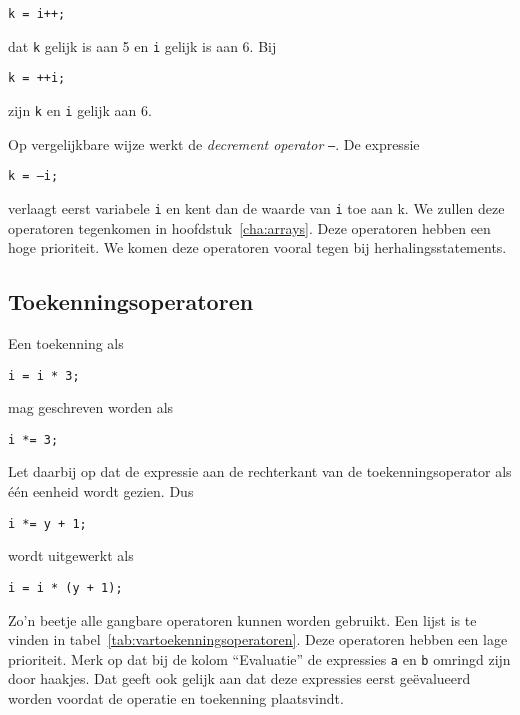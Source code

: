 \hspace*{1em}\texttt{k = i++;}

dat \texttt{k} gelijk is aan 5 en \texttt{i} gelijk is aan 6. Bij

\hspace*{1em}\texttt{k = ++i;}

zijn \texttt{k} en \texttt{i} gelijk aan 6.

Op vergelijkbare wijze werkt de \textsl{decrement operator} \texttt{--}\indexop{--}. De expressie

\hspace*{1em}\texttt{k = --i;}

verlaagt eerst variabele \texttt{i} en kent dan de waarde van \texttt{i} toe aan k. We zullen deze operatoren tegenkomen in hoofdstuk~\ref{cha:arrays}. Deze operatoren hebben een hoge prioriteit. We komen deze operatoren vooral tegen bij herhalingsstatements.

\subsection{Toekenningsoperatoren}
Een toekenning als

\hspace*{1em}\texttt{i = i * 3;}

mag geschreven worden als

\hspace*{1em}\texttt{i *= 3;}

Let daarbij op dat de expressie aan de rechterkant van de toekenningsoperator als één eenheid wordt gezien. Dus

\hspace*{1em}\texttt{i *= y + 1;}

wordt uitgewerkt als

\hspace*{1em}\texttt{i = i * (y + 1);}

Zo'n beetje alle gangbare operatoren kunnen worden gebruikt. Een lijst is te vinden in tabel~\ref{tab:vartoekenningsoperatoren}. Deze operatoren hebben een lage prioriteit. Merk op dat bij de kolom ``Evaluatie'' de expressies \texttt{a} en \texttt{b} omringd zijn door haakjes. Dat geeft ook gelijk aan dat deze expressies eerst geëvalueerd worden voordat de operatie en toekenning plaatsvindt.

